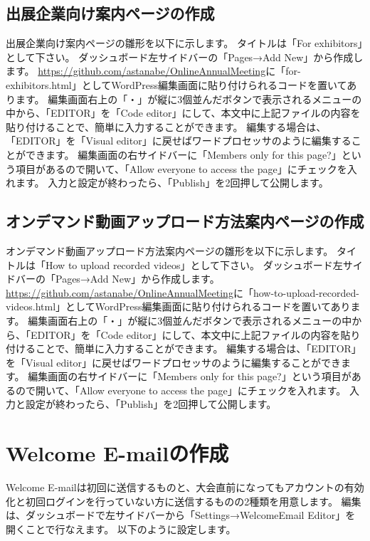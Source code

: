 \documentclass[titlepage,10pt,a4paper,uplatex]{jsbook}
\begin{document}
\subsection{出展企業向け案内ページの作成}

出展企業向け案内ページの雛形を以下に示します。
タイトルは「For exhibitors」として下さい。
ダッシュボード左サイドバーの「Pages→Add New」から作成します。
\url{https://github.com/astanabe/OnlineAnnualMeeting}に「for-exhibitors.html」としてWordPress編集画面に貼り付けられるコードを置いてあります。
編集画面右上の「・」が縦に3個並んだボタンで表示されるメニューの中から、「EDITOR」を「Code editor」にして、本文中に上記ファイルの内容を貼り付けることで、簡単に入力することができます。
編集する場合は、「EDITOR」を「Visual editor」に戻せばワードプロセッサのように編集することができます。
編集画面の右サイドバーに「Members only for this page?」という項目があるので開いて、「Allow everyone to access the page」にチェックを入れます。
入力と設定が終わったら、「Publish」を2回押して公開します。

\subsection{オンデマンド動画アップロード方法案内ページの作成}

オンデマンド動画アップロード方法案内ページの雛形を以下に示します。
タイトルは「How to upload recorded videos」として下さい。
ダッシュボード左サイドバーの「Pages→Add New」から作成します。
\url{https://github.com/astanabe/OnlineAnnualMeeting}に「how-to-upload-recorded-videos.html」としてWordPress編集画面に貼り付けられるコードを置いてあります。
編集画面右上の「・」が縦に3個並んだボタンで表示されるメニューの中から、「EDITOR」を「Code editor」にして、本文中に上記ファイルの内容を貼り付けることで、簡単に入力することができます。
編集する場合は、「EDITOR」を「Visual editor」に戻せばワードプロセッサのように編集することができます。
編集画面の右サイドバーに「Members only for this page?」という項目があるので開いて、「Allow everyone to access the page」にチェックを入れます。
入力と設定が終わったら、「Publish」を2回押して公開します。

\section{Welcome E-mailの作成}

Welcome E-mailは初回に送信するものと、大会直前になってもアカウントの有効化と初回ログインを行っていない方に送信するものの2種類を用意します。
編集は、ダッシュボードで左サイドバーから「Settings→WelcomeEmail Editor」を開くことで行なえます。
以下のように設定します。
\end{document}
